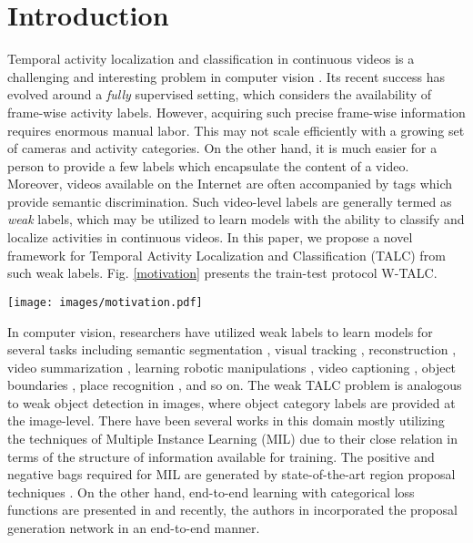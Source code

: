 \documentclass[runningheads]{llncs}
\begin{document}
\section{Introduction}
\label{intro}
Temporal activity localization and classification in continuous videos is a challenging and interesting problem in computer vision \cite{aggarwal2011human}. Its recent success \cite{xu2017r,zhao2017temporal} has evolved around a \textit{fully} supervised setting, which considers the availability of frame-wise activity labels. However, acquiring such precise frame-wise information requires enormous manual labor. This may not scale efficiently with a growing set of cameras and activity categories. On the other hand, it is much easier for a person to provide a few labels which encapsulate the content of a video. Moreover, videos available on the Internet are often accompanied by tags which provide semantic discrimination. Such video-level labels are generally termed as \textit{weak} labels, which may be utilized to learn models with the ability to classify and localize activities in continuous videos. In this paper, we propose a novel framework for Temporal Activity Localization and Classification (TALC) from such weak labels. Fig. \ref{motivation} presents the train-test protocol W-TALC. 

\begin{SCfigure}
	\centering
	\texttt{[image: images/motivation.pdf]}	
	\caption{This figure presents the train-test protocol of W-TALC. The training set consists of videos and the corresponding video-level activity tags. Whereas, while testing, the network not only estimates the labels of the activities in the video, but also temporally locates their occurrence representing the start ($s_j$) and end time ($e_j$), category ($c_j$) and confidence of recognition ($p_j$) of the $j^{th}$ activity located by the model.}
	\label{motivation}
\end{SCfigure}
In computer vision, researchers have utilized weak labels to learn models for several tasks including semantic segmentation \cite{hartmann2012weakly,khoreva2017simple,yan2017weakly}, visual tracking \cite{zhong2014visual}, reconstruction \cite{tulyakov2017weakly,kanazawa2016warpnet}, video summarization \cite{panda2017weakly}, learning robotic manipulations \cite{singh2017gplac}, video captioning \cite{shen2017weakly}, object boundaries \cite{khoreva2016weakly}, place recognition \cite{arandjelovic2016netvlad}, and so on. The weak TALC problem is analogous to weak object detection in images, where object category labels are provided at the image-level. There have been several works in this domain mostly utilizing the techniques of Multiple Instance Learning (MIL) \cite{zhou2004multi} due to their close relation in terms of the structure of information available for training. 
The positive and negative bags required for MIL are generated by state-of-the-art region proposal techniques \cite{li2016weakly,jie2017deep}. On the other hand, end-to-end learning with categorical loss functions are presented in \cite{durand2017wildcat,durand2016weldon,diba2016weakly,singh2017hide} and recently, the authors in \cite{zhu2017soft} incorporated the proposal generation network in an end-to-end manner. 
\end{document}
